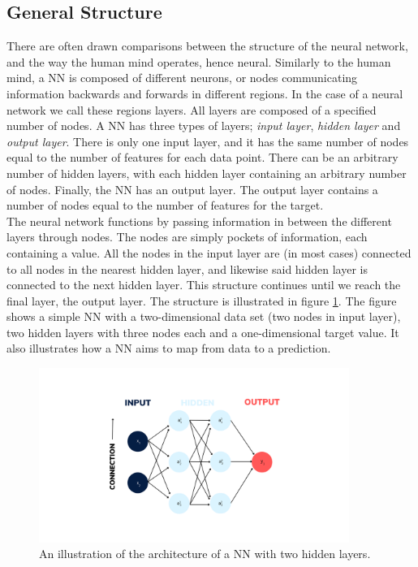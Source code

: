 \subsection{General Structure}
There are often drawn comparisons between the structure of the neural network, 
and the way the human mind operates, hence neural. Similarly to the human mind, a \ac{NN} is 
composed of different neurons, or nodes communicating information backwards and forwards in different 
regions. In the case of a neural network we call these regions layers. All layers
are composed of a specified number of nodes. A \ac{NN} has three types of layers;
\emph{input layer}, \emph{hidden layer} and \emph{output layer}. There is only one input layer, and it has
the same number of nodes equal to the number of features for each data point. 
There can be an arbitrary number of hidden layers, with each hidden layer containing
an arbitrary number of nodes. Finally, the \ac{NN} has an output layer. The output layer
contains a number of nodes equal to the number of features for the target.
\\
The neural network functions by passing information in between the different layers through 
nodes. The nodes are simply pockets of information, each containing a value. 
All the nodes in the input layer are (in most cases) connected to all nodes in the nearest hidden layer,
and likewise said hidden layer is connected to the next hidden layer. This structure continues
until we reach the final layer, the output layer. The structure is illustrated in figure
\ref{fig:NN}. The figure shows a simple \ac{NN} with a two-dimensional data set (two nodes in input layer),
two hidden layers with three nodes each and a one-dimensional target value. It also illustrates 
how a \ac{NN} aims to map from data to a prediction.
\begin{figure}
    \centering
    \vspace*{-12.5mm} 
    \includegraphics[width=0.9\textwidth]{Figures/Illustrations/Input_labels.png}
    \vspace*{-12.5mm} 
    \caption{An illustration of the architecture of a \acs{NN} with two hidden layers.}
    \label{fig:NN}
\end{figure}
